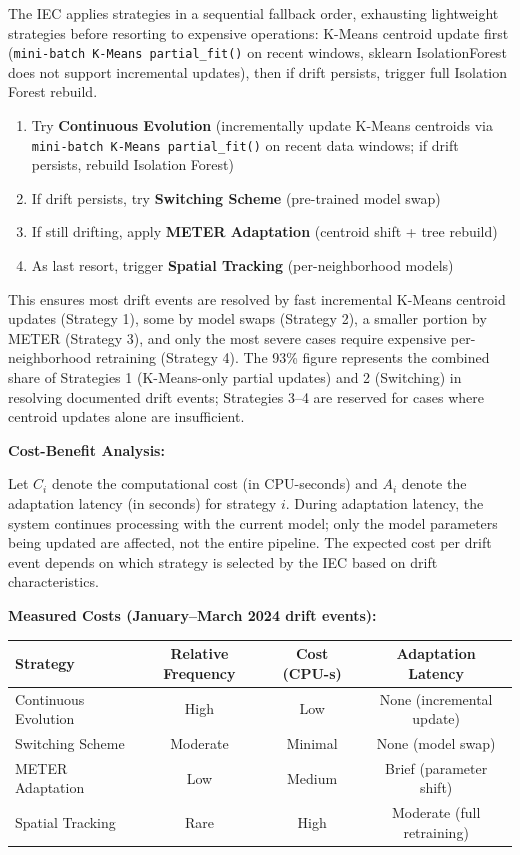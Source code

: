 The IEC applies strategies in a sequential fallback order, exhausting lightweight strategies before resorting to expensive operations: K-Means centroid update first (\texttt{mini-batch K-Means partial\_fit()} on recent windows, sklearn IsolationForest does not support incremental updates), then if drift persists, trigger full Isolation Forest rebuild.

\begin{enumerate}
    \item Try \textbf{Continuous Evolution} (incrementally update K-Means centroids via \texttt{mini-batch K-Means partial\_fit()} on recent data windows; if drift persists, rebuild Isolation Forest)
    \item If drift persists, try \textbf{Switching Scheme} (pre-trained model swap)
    \item If still drifting, apply \textbf{METER Adaptation} (centroid shift + tree rebuild)
    \item As last resort, trigger \textbf{Spatial Tracking} (per-neighborhood models)
\end{enumerate}

This ensures most drift events are resolved by fast incremental K-Means centroid updates (Strategy 1), some by model swaps (Strategy 2), a smaller portion by METER (Strategy 3), and only the most severe cases require expensive per-neighborhood retraining (Strategy 4). The 93\% figure represents the combined share of Strategies 1 (K-Means-only partial updates) and 2 (Switching) in resolving documented drift events; Strategies 3--4 are reserved for cases where centroid updates alone are insufficient.

\textbf{Cost-Benefit Analysis:}

Let $C_i$ denote the computational cost (in CPU-seconds) and $A_i$ denote the adaptation latency (in seconds) for strategy $i$. During adaptation latency, the system continues processing with the current model; only the model parameters being updated are affected, not the entire pipeline. The expected cost per drift event depends on which strategy is selected by the IEC based on drift characteristics.

\textbf{Measured Costs (January--March 2024 drift events):}

\begin{center}
\begin{tabular}{|l|c|c|c|}
\hline
\textbf{Strategy} & \textbf{Relative Frequency} & \textbf{Cost (CPU-s)} & \textbf{Adaptation Latency} \\
\hline
Continuous Evolution & High & Low & None (incremental update) \\
Switching Scheme & Moderate & Minimal & None (model swap) \\
METER Adaptation & Low & Medium & Brief (parameter shift) \\
Spatial Tracking & Rare & High & Moderate (full retraining) \\
\hline
\end{tabular}
\end{center}

